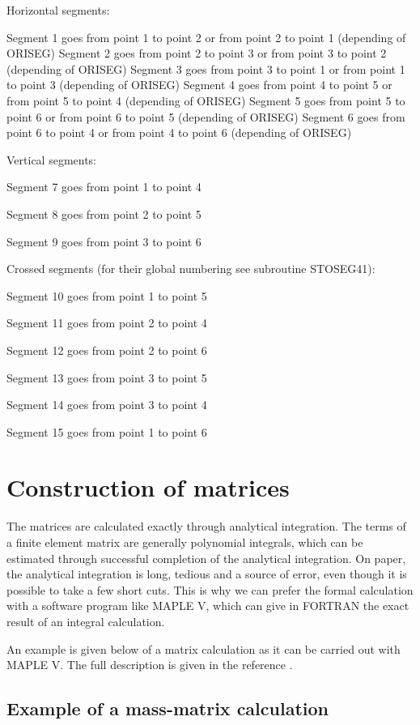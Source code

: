 Horizontal segments:

Segment 1 goes from point 1 to point 2 or from point 2 to point 1 (depending of ORISEG)
Segment 2 goes from point 2 to point 3 or from point 3 to point 2 (depending of ORISEG)
Segment 3 goes from point 3 to point 1 or from point 1 to point 3 (depending of ORISEG)
Segment 4 goes from point 4 to point 5 or from point 5 to point 4 (depending of ORISEG)
Segment 5 goes from point 5 to point 6 or from point 6 to point 5 (depending of ORISEG)
Segment 6 goes from point 6 to point 4 or from point 4 to point 6 (depending of ORISEG)

Vertical segments:

Segment 7 goes from point 1 to point 4

Segment 8 goes from point 2 to point 5

Segment 9 goes from point 3 to point 6

Crossed segments (for their global numbering see subroutine STOSEG41):

Segment 10 goes from point 1 to point 5

Segment 11 goes from point 2 to point 4

Segment 12 goes from point 2 to point 6

Segment 13 goes from point 3 to point 5

Segment 14 goes from point 3 to point 4

Segment 15 goes from point 1 to point 6

\section{Construction of matrices}

The \bief matrices are calculated exactly through analytical integration. The
terms of a finite element matrix are generally polynomial integrals, which can
be estimated through successful completion of the analytical integration. On
paper, the analytical integration is long, tedious and a source of error, even
though it is possible to take a few short cuts. This is why we can prefer the
formal calculation with a software program like MAPLE V, which can give in FORTRAN
the exact result of an integral calculation.

An example is given below of a matrix calculation as it can be carried out with
MAPLE V. The full description is given in the reference \cite{HervouetMaple}.

\subsection{Example of a mass-matrix calculation}

